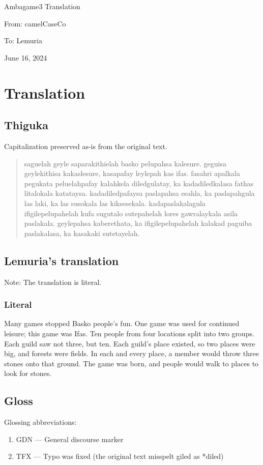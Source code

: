 \documentclass{thiguka}
\begin{document}
Ambagame3 Translation

From: camelCaseCo

To: Lemuria

June 16, 2024

\section{Translation}
\subsection{Thiguka}
Capitalization preserved as-is from the original text.

\begin{quotation}
saguelah geyle saparakithielah basko pelupahsa kalesure.
geguisa geylekithisa kakaslesure, kasapafay leylepah kas ifas.
fasahri apalkala pegukata peluelahpafay kalahkela diledgulatay, ka kadadiledkalasa fathas litalokala katataysa.
kadadiledpafaysa paslapahsa esahla, ka paslapahgula las laki, ka las susokala las kiksesekala.
kadapaslakalagula ifigilepelupahelah kufa sugutalo sutepahelah lores gawralaykala asila paslakala.
geylepahsa kaberethata, ka ifigilepelupahelah kalakad paguiba paslakalasa, ka kasakaki sutetayelah.
\end{quotation}


\subsection{Lemuria's translation}
Note: The translation is literal.

\subsubsection{Literal}
Many games stopped Basko people's fun.
One game was used for continued leisure; this game was Ifas.
Ten people from four locations split into two groups.
Each guild saw not three, but ten.
Each guild's place existed, so two places were big, and forests were fields.
In each and every place, a member would throw three stones onto that ground.
The game was born, and people would walk to places to look for stones.

\subsection{Gloss}
Glossing abbreviations:
\begin{enumerate}
    \item GDN --- General discourse marker
    \item TFX --- Typo was fixed (the original text misspelt giled as *diled)
\end{enumerate}
\end{document}
